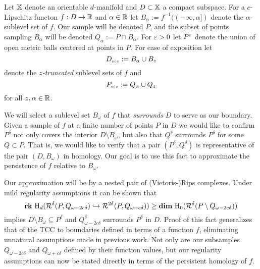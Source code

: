 
Let $\mathbb{X}$ denote an orientable $d$-manifold and $D\subset\mathbb{X}$ a compact subspace.
For a $c$-Lipschitz functon $f : D\to \mathbb{R}$ and $\alpha\in\mathbb{R}$ let $B_\alpha := f^{-1}((-\infty,\alpha])$ denote the $\alpha$-sublevel set of $f$.
Our sample will be denoted $P$, and the subset of points sampling $B_\alpha$ will be denoted $Q_\alpha := P\cap B_\alpha$.
For $\varepsilon > 0$ let $P^\varepsilon$ denote the union of open metric balls centered at points in $P$.
For ease of exposition let
\[ D_{\scriptscriptstyle \alpha\mid z} := B_\alpha\cup B_z \]
denote the \emph{$z$-truncated} sublevel sets of $f$ and %
\[ P_{\scriptscriptstyle \alpha\mid z} := Q_\alpha\cup Q_z\]
for all $z,\alpha\in\mathbb{R}$.

We will select a sublevel set $B_\omega$ of $f$ that \emph{surrounds} $D$ to serve as our boundary.
Given a sample of $f$ at a finite number of points $P$ in $D$ we would like to confirm $P^\delta$ not only covers the interior $D\setminus B_\omega$, but also that $Q^\delta$ surrounds $P^\delta$ for some $Q\subset P$.
That is, we would like to verify that a pair $(P^\delta, Q^\delta)$ is representative of the pair $(D,B_\omega)$ in homology.
Our goal is to use this fact to approximate the persistence of $f$ relative to $B_\omega$.

Our approximation will be by a nested pair of (Vietoris-)Rips complexes.
Under mild regularity assumptions it can be shown that
\[ \mathbf{rk}~\mathrm{H}_d(\mathcal{R}^\delta(P, Q_{\omega - 2c\delta})\hookrightarrow \mathcal{R}^{2\delta}(P, Q_{\omega+c\delta}))\geq \mathbf{dim}~\mathrm{H}_0(\mathcal{R}^\delta(P\setminus Q_{\omega-2c\delta}))\]
implies $D\setminus B_\omega\subseteq P^\delta$ and $Q_{\omega-2c\delta}^\delta$ surrounds $P^\delta$ in $D$.
Proof of this fact generalizes that of the TCC to boundaries defined in terms of a function $f$, eliminating unnatural assumptions made in previous work.
Not only are our subsamples $Q_{\omega-2c\delta}$ and $Q_{\omega+c\delta}$ defined by their function values, but our regularity assumptions can now be stated directly in terms of the persistent homology of $f$.

